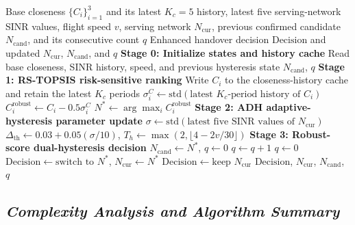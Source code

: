 \documentclass[10pt,a4paper]{article}
\begin{document}
\begin{algorithm}[H]
\caption{ALERA risk-aware vertical-handoff enhancement procedure}
\label{alg:alera}
\small
\begin{algorithmic}[1]
\Require Base closeness $\{C_i\}_{i=1}^{3}$ and its latest $K_c=5$ history, latest five serving-network SINR values, flight speed $v$, serving network $N_{\mathrm{cur}}$, previous confirmed candidate $N_{\mathrm{cand}}$, and its consecutive count $q$
\Ensure Enhanced handover decision $\mathrm{Decision}$ and updated $N_{\mathrm{cur}}$, $N_{\mathrm{cand}}$, and $q$
\State \textbf{Stage 0: Initialize states and history cache}
\State Read base closeness, SINR history, speed, and previous hysteresis state $N_{\mathrm{cand}}$, $q$
\State \textbf{Stage 1: RS-TOPSIS risk-sensitive ranking}
 \State Write $C_i$ to the closeness-history cache and retain the latest $K_c$ periods
 \State $\sigma_i^C\gets\mathrm{std}(\text{latest }K_c\text{-period history of }C_i)$
 \State $C_i^{\mathrm{robust}}\gets C_i-0.5\sigma_i^C$
\EndFor
\State $N^*\gets\arg\max_i C_i^{\mathrm{robust}}$
\State \textbf{Stage 2: ADH adaptive-hysteresis parameter update}
\State $\sigma\gets\mathrm{std}(\text{latest five SINR values of }N_{\mathrm{cur}})$
\State $\Delta_{\mathrm{th}}\gets0.03+0.05(\sigma/10)$, $T_h\gets\max(2,\lfloor4-2v/30\rfloor)$
\State \textbf{Stage 3: Robust-score dual-hysteresis decision}
 \State $N_{\mathrm{cand}}\gets N^*$, $q\gets0$
\EndIf
{}
 \State $q\gets q+1$
\Else
 \State $q\gets0$
\EndIf
{}
 \State $\mathrm{Decision}\gets\text{switch to }N^*$, $N_{\mathrm{cur}}\gets N^*$
\Else
 \State $\mathrm{Decision}\gets\text{keep }N_{\mathrm{cur}}$
\EndIf
\State \Return $\mathrm{Decision}$, $N_{\mathrm{cur}}$, $N_{\mathrm{cand}}$, $q$
\end{algorithmic}
\end{algorithm}

\subsection{\textit{Complexity Analysis and Algorithm Summary}}
\end{document}
